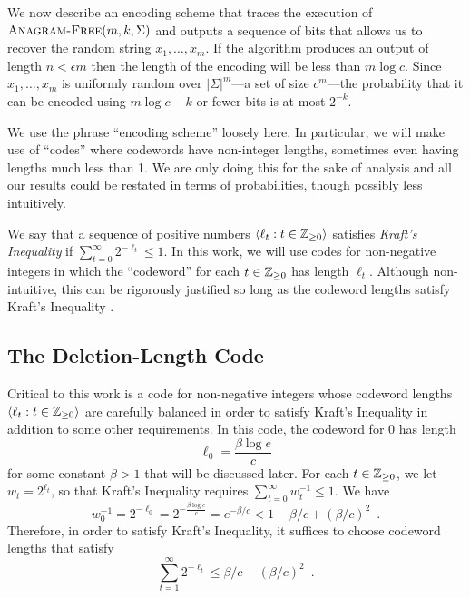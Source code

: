 \documentclass{patmorin}
\begin{document}
We now describe an encoding scheme that traces the execution of $\textsc{Anagram-Free}(m, k, \Sigma)$ and outputs a sequence of bits that allows us to recover the random string $x_1,\ldots,x_m$.  If the algorithm produces an output of length $n < \epsilon m$ then the length of the encoding will be less than $m\log c$.  Since $x_1,\ldots,x_m$ is uniformly random over $|\Sigma|^m$---a set of size $c^m$---the probability that it can be encoded using $m\log c - k$ or fewer bits is at most $2^{-k}$.

We use the phrase ``encoding scheme'' loosely here.  In particular, we will make use of ``codes'' where codewords have non-integer lengths, sometimes even having lengths much less than 1.  We are only doing this for the sake of analysis and all our results could be restated in terms of probabilities, though possibly less intuitively.

We say that a sequence of positive numbers $\langle \ell_t : t\in\mathbb{Z}_{\ge 0}\rangle$ satisfies \emph{Kraft's Inequality} if $\sum_{t=0}^{\infty} 2^{-\ell_t} \le 1$.  In this work, we will use codes for non-negative integers in which the ``codeword'' for each $t\in\mathbb{Z}_{\ge 0}$ has length $\ell_t$. Although non-intuitive, this can be rigorously justified so long as the codeword lengths satisfy Kraft's Inequality \cite[Section~7]{morin.mulzer.ea:encoding}.

\subsection{The Deletion-Length Code}

Critical to this work is a code for non-negative integers whose codeword lengths $\langle \ell_t:t\in\mathbb{Z}_{\ge0}\rangle$ are carefully balanced in order to satisfy Kraft's Inequality in addition to some other requirements.  In this code, the codeword for 0 has length
\[
     \ell_0 = \frac{\beta\log e}{c}
\]
for some constant $\beta > 1$ that will be discussed later.  For each $t\in \mathbb{Z}_{\ge0}$, we let $w_t=2^{\ell_t}$, so that Kraft's Inequality requires $\sum_{t=0}^\infty w_t^{-1} \le 1$.  We have
\[
   w_0^{-1} = 2^{-\ell_0} = 2^{-\tfrac{\beta\log e}{c}} = e^{-\beta/c} < 1-\beta/c + (\beta/c)^2 \enspace .
\]
Therefore, in order to satisfy Kraft's Inequality, it suffices to choose  codeword lengths that satisfy
\[
   \sum_{t=1}^\infty 2^{-\ell_t} \le \beta/c - (\beta/c)^2 \enspace .
\]
\end{document}
